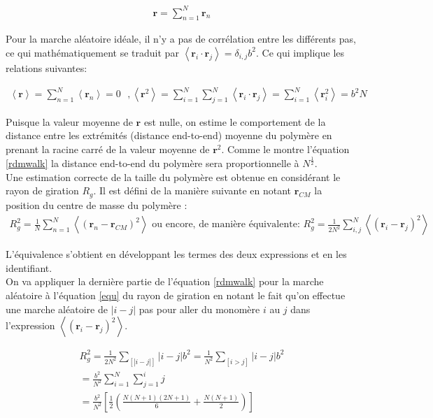 \documentclass[a4paper,11pt]{article}
\begin{document}
\begin{eqnarray}
\textbf{r} = \sum_{n = 1}^{N} \textbf{r}_n
\end{eqnarray}

Pour la marche aléatoire idéale, il n'y a pas de corrélation entre les différents pas, ce qui mathématiquement se traduit par $\left<\textbf{r}_i \cdot \textbf{r}_j\right> = \delta_{i,j} b^2$. Ce qui implique les relations suivantes:

\begin{eqnarray}
\left<\textbf{r}\right>\text{} = \sum_{n = 1}^{N} \left<\textbf{r}_n \right>\text{} =\text{} 0 \text{ }, \text{} \left<\textbf{r}^2\right> \text{}= \sum_{i = 1}^{N} \sum_{j = 1}^{N} \left<\textbf{r}_i \cdot \textbf{r}_j\right> \text{}= \sum_{i = 1}^{N} \left<\textbf{r}_i^2\right> \text{}= b^2 N
\label{rdmwalk}
\end{eqnarray}

 Puisque la valeur moyenne de $\textbf{r}$ est nulle, on estime le comportement de la distance entre les extrémités (distance end-to-end) moyenne du polymère en prenant la racine carré de la valeur moyenne de $\textbf{r}^2$. Comme le montre l'équation \ref{rdmwalk} la distance end-to-end du polymère sera proportionnelle à $N^\frac{1}{2}$.\\
 
 Une estimation correcte de la taille du polymère est obtenue en considérant le rayon de giration $R_g$. Il est défini de la manière suivante en notant $\textbf{r}_{CM}$ la position du centre de masse du polymère :
 \begin{eqnarray}
R_g^2\text{}=\text{}\frac{1}{N}\sum_{n = 1}^{N} \left<(\textbf{r}_n-\textbf{r}_{CM})^2\right>
 \text{ ou encore, de manière équivalente: }
R_g^2\text{}=\text{}\frac{1}{2N^2}\sum_{i,j}^N \left<(\textbf{r}_i-\textbf{r}_{j})^2\right>
\label{equ}
\end{eqnarray}
 
 L'équivalence s'obtient en développant les termes des deux expressions et en les identifiant.\\


On va appliquer la dernière partie de l'équation \ref{rdmwalk} pour la marche aléatoire à l'équation \ref{equ} du rayon de giration en notant le fait qu'on effectue une marche aléatoire de $|i-j|$ pas pour aller du monomère $i$ au $j$ dans l'expression $\left<(\textbf{r}_i - \textbf{r}_j)^2\right>$.

\begin{gather}
R_g^2\text{}=\text{}\frac{1}{2N^2}\sum_{[|i-j|]} |i-j| b^2=\text{}\frac{1}{N^2}\sum_{[i>j]} |i-j| b^2\nonumber \\
=\text{}\frac{b^2}{N^2} \sum_{i=1}^N \sum_{j=1}^{i} j \\
 = \text{}\frac{b^2}{N^2}[\frac{1}{2}(\frac{N(N+1)(2N+1)}{6}+\frac{N(N+1)}{2})]\nonumber
\label{gyr}
\end{gather}
\end{document}
